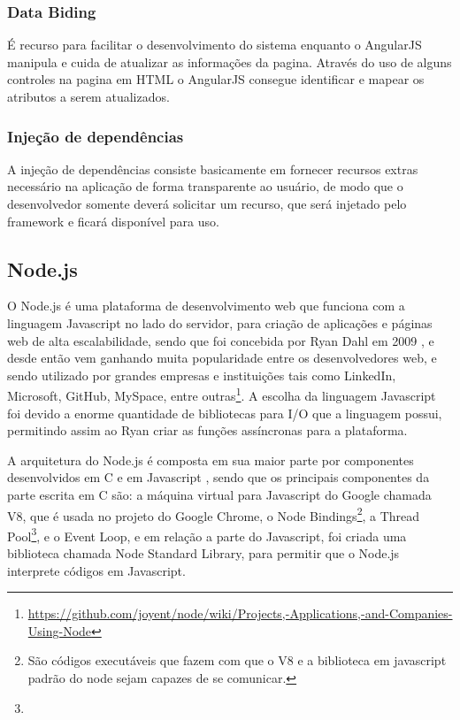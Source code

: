 \subsubsection{Data Biding}

É recurso para facilitar o desenvolvimento do sistema enquanto o AngularJS manipula e cuida de atualizar as informações da pagina. Através do uso de alguns controles na pagina em HTML o AngularJS consegue identificar e mapear os atributos a serem atualizados.

\subsubsection{Injeção de dependências}

A injeção de dependências consiste basicamente  em fornecer recursos extras necessário na aplicação de forma transparente ao usuário, de modo que o desenvolvedor somente deverá solicitar um recurso, que será injetado pelo framework e ficará disponível para uso.

\subsection{Node.js}
O Node.js é uma plataforma de desenvolvimento web que funciona com a linguagem Javascript no lado do servidor, para criação de aplicações e páginas web de alta escalabilidade, sendo que foi concebida por  Ryan Dahl em 2009 \cite{appRealTime}, e desde então vem ganhando muita popularidade entre os desenvolvedores web, e sendo utilizado por grandes empresas e instituições tais como LinkedIn, Microsoft, GitHub, MySpace, entre outras\footnote{\url{https://github.com/joyent/node/wiki/Projects,-Applications,-and-Companies-Using-Node}}. A escolha da linguagem Javascript foi devido a enorme quantidade de bibliotecas para I/O que a linguagem possui, permitindo assim ao Ryan criar as funções assíncronas para a plataforma. 

A arquitetura do Node.js é composta em sua maior parte por componentes  desenvolvidos em C e em Javascript \cite{nodeInAction}, sendo que os principais componentes da parte escrita em C são: a  máquina virtual para Javascript do Google chamada V8, que é usada no projeto do Google Chrome, o Node Bindings\footnote{São códigos executáveis que fazem com que o V8 e a biblioteca em javascript padrão do node sejam capazes de se comunicar.}, a Thread Pool\footnote{}, e o Event Loop, e em relação a parte do Javascript, foi criada uma biblioteca chamada Node Standard Library, para permitir que o Node.js interprete códigos em Javascript.


